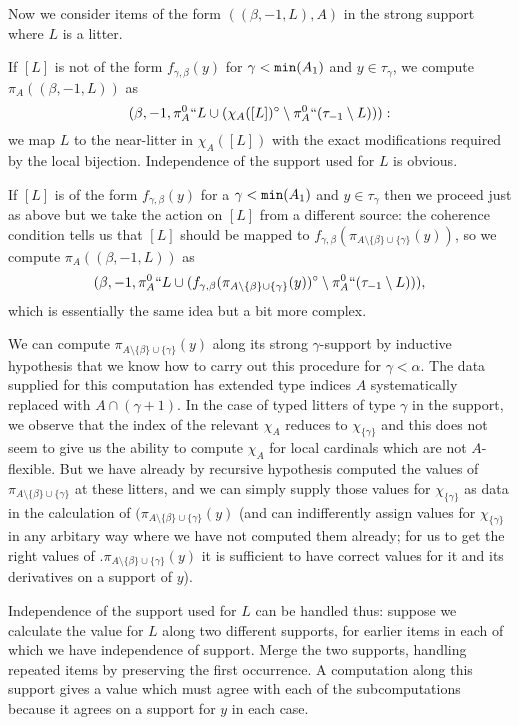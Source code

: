 \documentclass[112pt]{article}
\begin{document}
\begin{description}
Now we consider items of the form $((\beta,-1,L),A)$ in the strong support where $L$ is a litter.

If $[L]$ is not of the form $f_{\gamma,\beta}(y)$ for $\gamma<{\tt min}(A_1)$ and $y \in \tau_\gamma$,
we compute $\pi_A((\beta,-1,L))$ as $$(\beta,-1,\pi^0_A``L \cup (\chi_A([L])^\circ \setminus \pi^0_A``(\tau_{-1} \setminus L))):$$ we map
$L$ to the near-litter in $\chi_A([L])$ with the exact modifications required by the local bijection.  Independence of the support used for $L$ is obvious.

If $[L]$ is of the form $f_{\gamma,\beta}(y)$ for a $\gamma<{\tt min}(A_1)$ and $y \in \tau_\gamma$ then we proceed just as above but we take the action on $[L]$ from a different source:
the coherence condition tells us that $[L]$ should be mapped to $f_{\gamma,\beta}(\pi_{A \setminus \{\beta\} \cup \{\gamma\}}(y))$, so we compute
$\pi_A((\beta,-1,L))$ as $$(\beta,-1,\pi^0_A``L \cup (f_{\gamma,\beta}(\pi_{A \setminus \{\beta\} \cup \{\gamma\}}(y))^\circ \setminus \pi^0_A``(\tau_{-1}\setminus L))),$$  which is essentially the same idea but a bit more complex.

We can compute $\pi_{A \setminus \{\beta\} \cup \{\gamma\}}(y)$ along its strong $\gamma$-support by inductive hypothesis that we know how to carry out this procedure for $\gamma<\alpha$.  The data supplied for this computation has extended type indices $A$ systematically replaced with
$A \cap (\gamma+1)$.  In the case of typed litters of type $\gamma$ in the support, we observe that the index of the relevant $\chi_A$ reduces
to $\chi_{\{\gamma\}}$ and this does not seem to give us the ability to compute $\chi_A$ for local cardinals which are not $A$-flexible.  But we have
already by recursive hypothesis computed the values of $\pi_{A \setminus \{\beta\} \cup \{\gamma\}}$ at these litters, and we can simply supply those values for $\chi_{\{\gamma\}}$ as data in the calculation of $(\pi_{A \setminus \{\beta\} \cup \{\gamma\}}(y)$ (and can indifferently assign values
for $\chi_{\{\gamma\}}$ in any arbitary way where we have not computed them already;  for us to get the right values of .$\pi_{A \setminus \{\beta\} \cup \{\gamma\}}(y)$ it is sufficient to have correct values for it and its derivatives on a support of $y$).

Independence of the support used for $L$ can be handled thus:  suppose we calculate the value for $L$ along two different supports, for earlier items in each of which we have independence of support.  Merge the two supports, handling repeated items by preserving the first occurrence.  A computation along this support gives a value which must agree with each of the subcomputations because it agrees on a support for $y$ in each case.


\end{description}
\end{document}

